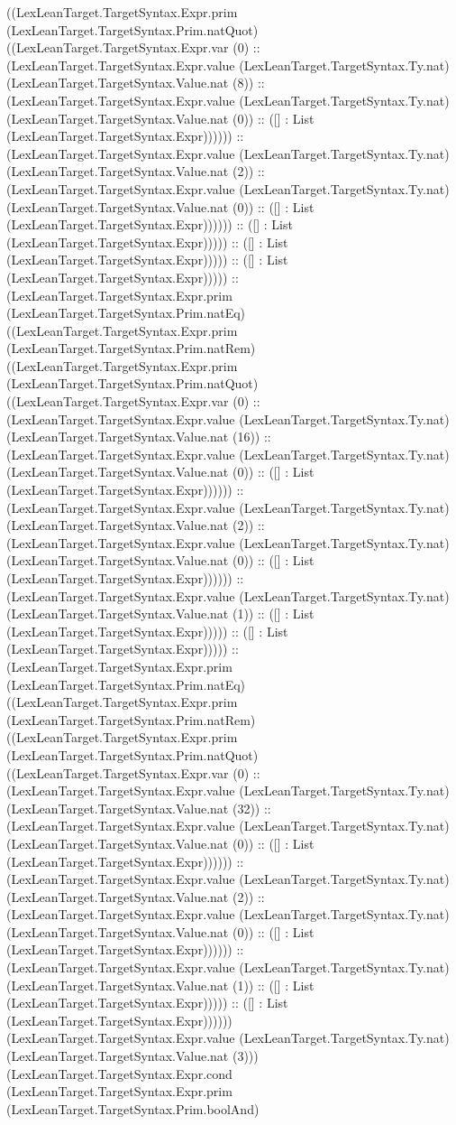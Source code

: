 \documentclass[11pt]{article}
\begin{document}
((LexLeanTarget.TargetSyntax.Expr.prim (LexLeanTarget.TargetSyntax.Prim.natQuot) ((LexLeanTarget.TargetSyntax.Expr.var (0) :: (LexLeanTarget.TargetSyntax.Expr.value (LexLeanTarget.TargetSyntax.Ty.nat) (LexLeanTarget.TargetSyntax.Value.nat (8)) :: (LexLeanTarget.TargetSyntax.Expr.value (LexLeanTarget.TargetSyntax.Ty.nat) (LexLeanTarget.TargetSyntax.Value.nat (0)) :: ([] : List (LexLeanTarget.TargetSyntax.Expr)))))) :: (LexLeanTarget.TargetSyntax.Expr.value (LexLeanTarget.TargetSyntax.Ty.nat) (LexLeanTarget.TargetSyntax.Value.nat (2)) :: (LexLeanTarget.TargetSyntax.Expr.value (LexLeanTarget.TargetSyntax.Ty.nat) (LexLeanTarget.TargetSyntax.Value.nat (0)) :: ([] : List (LexLeanTarget.TargetSyntax.Expr)))))) :: ([] : List (LexLeanTarget.TargetSyntax.Expr))))) :: ([] : List (LexLeanTarget.TargetSyntax.Expr))))) :: ([] : List (LexLeanTarget.TargetSyntax.Expr))))) :: (LexLeanTarget.TargetSyntax.Expr.prim (LexLeanTarget.TargetSyntax.Prim.natEq) ((LexLeanTarget.TargetSyntax.Expr.prim (LexLeanTarget.TargetSyntax.Prim.natRem) ((LexLeanTarget.TargetSyntax.Expr.prim (LexLeanTarget.TargetSyntax.Prim.natQuot) ((LexLeanTarget.TargetSyntax.Expr.var (0) :: (LexLeanTarget.TargetSyntax.Expr.value (LexLeanTarget.TargetSyntax.Ty.nat) (LexLeanTarget.TargetSyntax.Value.nat (16)) :: (LexLeanTarget.TargetSyntax.Expr.value (LexLeanTarget.TargetSyntax.Ty.nat) (LexLeanTarget.TargetSyntax.Value.nat (0)) :: ([] : List (LexLeanTarget.TargetSyntax.Expr)))))) :: (LexLeanTarget.TargetSyntax.Expr.value (LexLeanTarget.TargetSyntax.Ty.nat) (LexLeanTarget.TargetSyntax.Value.nat (2)) :: (LexLeanTarget.TargetSyntax.Expr.value (LexLeanTarget.TargetSyntax.Ty.nat) (LexLeanTarget.TargetSyntax.Value.nat (0)) :: ([] : List (LexLeanTarget.TargetSyntax.Expr)))))) :: (LexLeanTarget.TargetSyntax.Expr.value (LexLeanTarget.TargetSyntax.Ty.nat) (LexLeanTarget.TargetSyntax.Value.nat (1)) :: ([] : List (LexLeanTarget.TargetSyntax.Expr))))) :: ([] : List (LexLeanTarget.TargetSyntax.Expr))))) :: (LexLeanTarget.TargetSyntax.Expr.prim (LexLeanTarget.TargetSyntax.Prim.natEq) ((LexLeanTarget.TargetSyntax.Expr.prim (LexLeanTarget.TargetSyntax.Prim.natRem) ((LexLeanTarget.TargetSyntax.Expr.prim (LexLeanTarget.TargetSyntax.Prim.natQuot) ((LexLeanTarget.TargetSyntax.Expr.var (0) :: (LexLeanTarget.TargetSyntax.Expr.value (LexLeanTarget.TargetSyntax.Ty.nat) (LexLeanTarget.TargetSyntax.Value.nat (32)) :: (LexLeanTarget.TargetSyntax.Expr.value (LexLeanTarget.TargetSyntax.Ty.nat) (LexLeanTarget.TargetSyntax.Value.nat (0)) :: ([] : List (LexLeanTarget.TargetSyntax.Expr)))))) :: (LexLeanTarget.TargetSyntax.Expr.value (LexLeanTarget.TargetSyntax.Ty.nat) (LexLeanTarget.TargetSyntax.Value.nat (2)) :: (LexLeanTarget.TargetSyntax.Expr.value (LexLeanTarget.TargetSyntax.Ty.nat) (LexLeanTarget.TargetSyntax.Value.nat (0)) :: ([] : List (LexLeanTarget.TargetSyntax.Expr)))))) :: (LexLeanTarget.TargetSyntax.Expr.value (LexLeanTarget.TargetSyntax.Ty.nat) (LexLeanTarget.TargetSyntax.Value.nat (1)) :: ([] : List (LexLeanTarget.TargetSyntax.Expr))))) :: ([] : List (LexLeanTarget.TargetSyntax.Expr)))))) (LexLeanTarget.TargetSyntax.Expr.value (LexLeanTarget.TargetSyntax.Ty.nat) (LexLeanTarget.TargetSyntax.Value.nat (3))) (LexLeanTarget.TargetSyntax.Expr.cond (LexLeanTarget.TargetSyntax.Expr.prim (LexLeanTarget.TargetSyntax.Prim.boolAnd) 
\end{document}
